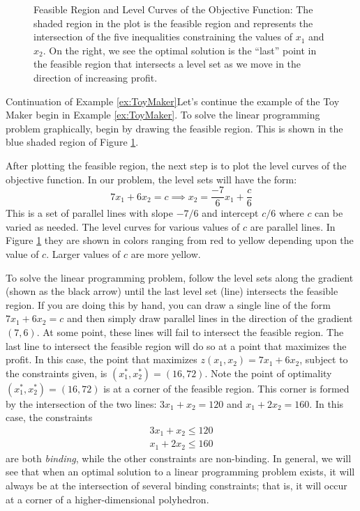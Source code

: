 \begin{figure}[H]
\caption{Feasible Region and Level Curves of the Objective Function: The shaded region in the plot is the feasible region and represents the intersection of the five inequalities constraining the values of $x_1$ and $x_2$. On the right, we see the optimal solution is the ``last'' point in the feasible region that intersects a level set as we move in the direction of increasing profit.}
\label{fig:ToyExampleFeasibleRegion}
\end{figure}

\begin{example}{Continuation of Example \ref{ex:ToyMaker}}{}Let's continue the example of the Toy Maker begin in Example \ref{ex:ToyMaker}. To solve the linear programming problem graphically, begin by drawing the feasible region. This is shown in the blue shaded region of Figure \ref{fig:ToyExampleFeasibleRegion}. 


After plotting the feasible region, the next step is to plot the level curves of the objective function. In our problem, the level sets will have the form:
\begin{displaymath}
7x_1 + 6x_2 = c \implies x_2 = \frac{-7}{6}x_1 + \frac{c}{6}
\end{displaymath}
This is a set of parallel lines with slope $-7/6$ and intercept $c/6$ where $c$ can be varied as needed. The level curves for various values of $c$ are parallel lines. In Figure \ref{fig:ToyExampleFeasibleRegion} they are shown in colors ranging from red to yellow depending upon the value of $c$. Larger values of $c$ are more yellow. 

To solve the linear programming problem, follow the level sets along the gradient (shown as the black arrow) until the last level set (line) intersects the feasible region. If you are doing this by hand, you can draw a single line of the form $7x_1 + 6x_2 = c$ and then simply draw parallel lines in the direction of the gradient $(7,6)$. At some point, these lines will fail to intersect the feasible region. The last line to intersect the feasible region will do so at a point that maximizes the profit. In this case, the point that maximizes $z(x_1,x_2) = 7x_1 + 6x_2$, subject to the constraints given, is $(x_1^*, x_2^*) = (16,72)$. 
\newpage
Note the point of optimality $(x_1^*, x_2^*) = (16,72)$ is at a corner of the feasible region. This corner is formed by the intersection of the two lines: $3x_1 + x_2 = 120$ and $x_1 + 2x_2 = 160$. In this case, the constraints 
\begin{gather*}
3x_1 + x_2 \leq 120\\
x_1 + 2x_2 \leq 160
\end{gather*}
are both \textit{binding}, while the other constraints are non-binding. In general, we will see that when an optimal solution to a linear programming problem exists, it will always be at the intersection of several binding constraints; that is, it will occur at a corner of a higher-dimensional polyhedron.  
\end{example}

